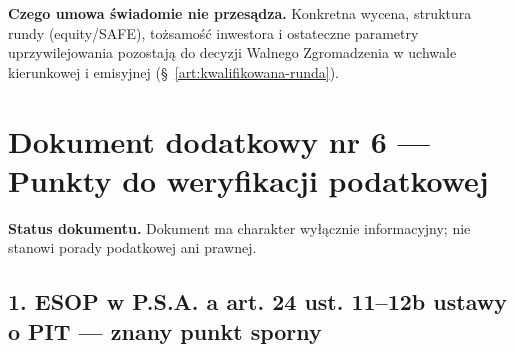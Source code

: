 \documentclass[12pt,a4paper]{report}
\begin{document}
\textbf{Czego umowa świadomie nie przesądza.} Konkretna wycena, struktura rundy (equity/SAFE), tożsamość inwestora i ostateczne parametry uprzywilejowania pozostają do decyzji Walnego Zgromadzenia w uchwale kierunkowej i emisyjnej (§~\ref{art:kwalifikowana-runda}).

\clearpage
\section*{Dokument dodatkowy nr 6 — Punkty do weryfikacji podatkowej}
\label{annex:podatki}

\textbf{Status dokumentu.} Dokument ma charakter wyłącznie informacyjny; nie stanowi porady podatkowej ani prawnej.

\subsection*{1. ESOP w P.S.A. a art. 24 ust. 11--12b ustawy o PIT --- znany punkt sporny}
\end{document}
